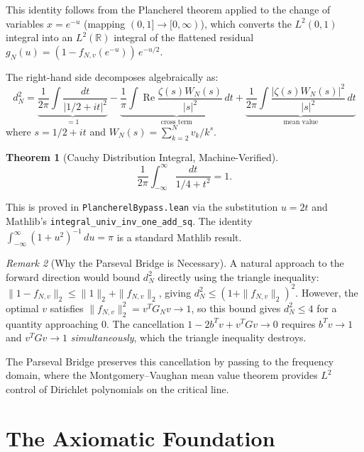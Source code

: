 \documentclass[11pt,a4paper]{article}
\theoremstyle{plain}
\newtheorem{theorem}{Theorem}[section]
\theoremstyle{definition}
\theoremstyle{remark}
\newtheorem{remark}[theorem]{Remark}
\newcommand{\re}{\operatorname{Re}}
\newcommand{\RR}{\mathbb{R}}
\newcommand{\lean}[1]{\texttt{#1}}
\begin{document}
This identity follows from the Plancherel theorem applied to the change
of variables $x = e^{-u}$ (mapping $(0,1] \to [0,\infty)$), which
converts the $L^2(0,1)$ integral into an $L^2(\RR)$ integral of the
flattened residual $g_N(u) = (1 - f_{N,v}(e^{-u}))\,e^{-u/2}$.

The right-hand side decomposes algebraically as:
\begin{equation}
\label{eq:three-term}
  d_N^2 = \underbrace{\frac{1}{2\pi}\int \frac{dt}{|1/2+it|^2}}_{= 1}
  - \underbrace{\frac{1}{\pi}\int \re\frac{\zeta(s)W_N(s)}{|s|^2}\,dt}_{\text{cross term}}
  + \underbrace{\frac{1}{2\pi}\int \frac{|\zeta(s)W_N(s)|^2}{|s|^2}\,dt}_{\text{mean value}}
\end{equation}
where $s = 1/2 + it$ and $W_N(s) = \sum_{k=2}^N v_k / k^s$.

\begin{theorem}[Cauchy Distribution Integral, Machine-Verified]
\label{thm:term1}
\[
  \frac{1}{2\pi}\int_{-\infty}^\infty \frac{dt}{1/4 + t^2} = 1.
\]
\end{theorem}

This is proved in \lean{PlancherelBypass.lean} via the substitution
$u = 2t$ and Mathlib's \lean{integral\_univ\_inv\_one\_add\_sq}. The
identity $\int_{-\infty}^\infty (1+u^2)^{-1}\,du = \pi$ is a standard
Mathlib result.

\begin{remark}[Why the Parseval Bridge is Necessary]
\label{rem:triangle}
A natural approach to the forward direction would bound $d_N^2$ directly
using the triangle inequality:
$\|1 - f_{N,v}\|_2 \leq \|1\|_2 + \|f_{N,v}\|_2$, giving
$d_N^2 \leq (1 + \|f_{N,v}\|_2)^2$. However, the optimal $v$ satisfies
$\|f_{N,v}\|_2^2 = v^T G_N v \to 1$, so this bound gives $d_N^2 \leq 4$
for a quantity approaching $0$. The cancellation $1 - 2b^Tv + v^TGv \to 0$
requires $b^Tv \to 1$ and $v^TGv \to 1$ \emph{simultaneously}, which
the triangle inequality destroys.

The Parseval Bridge preserves this cancellation by passing to the
frequency domain, where the Montgomery--Vaughan mean value theorem
provides $L^2$ control of Dirichlet polynomials on the critical line.
\end{remark}

\section{The Axiomatic Foundation}
\label{sec:axioms}
\end{document}
